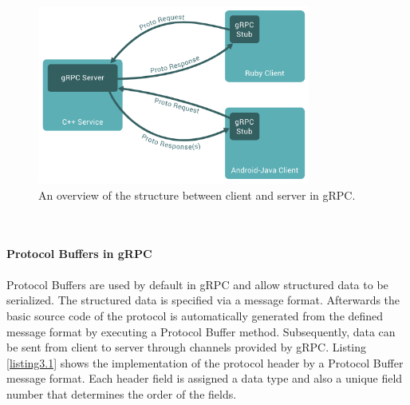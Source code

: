 \begin{figure}[tbp]
  \centering
  \includegraphics[width=0.8\textwidth]{images/grpc.png}
  \caption[gRPC Framework Structure]{An overview of the structure between client and server in gRPC.}
  \label{fig:gRPC_structure}
\end{figure}\\
\\
\textbf{Protocol Buffers in gRPC}
\\
\\
Protocol Buffers are used by default in gRPC and allow structured data to be serialized. %
The structured data is specified via a message format. Afterwards the basic source code of the protocol is automatically generated from the defined message format by executing a Protocol Buffer method. Subsequently, data can be sent from client to server through channels provided by gRPC. Listing \ref{listing3.1} shows the implementation of the protocol header by a Protocol Buffer message format. Each header field is assigned a data type and also a unique field number that determines the order of the fields.\\

